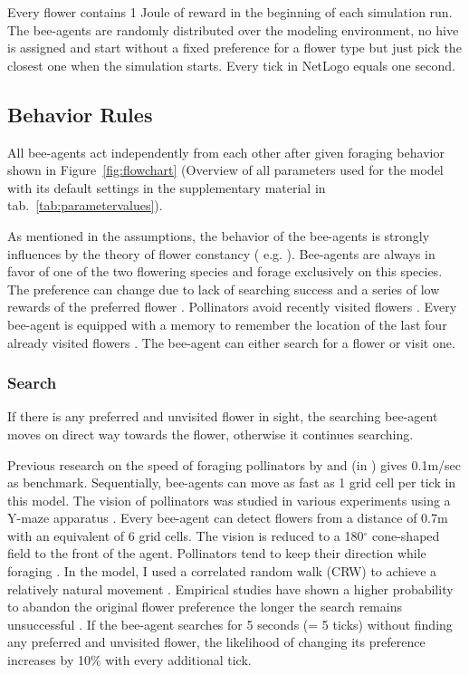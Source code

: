 Every flower contains 1 Joule of reward in the beginning of each simulation run. The bee-agents are randomly distributed over the modeling environment, no hive is assigned and start without a fixed preference for a flower type but just pick the closest one when the simulation starts. Every tick in NetLogo equals one second. 

\subsection*{Behavior Rules}

All bee-agents act independently from each other after given foraging behavior shown in Figure~\ref{fig:flowchart} (Overview of all parameters used for the model with its default settings in the supplementary material in tab.~\ref{tab:parametervalues}).  

As mentioned in the assumptions, the behavior of the bee-agents is strongly influences by the theory of flower constancy ( e.g. \citealp{bobisud1975pollinator, chittka1997foraging, thomson1981field, chittka1999flower,  goulson1994model,  goulson1999foraging}). Bee-agents are always in favor of one of the two flowering species and forage exclusively on this species. The preference can change due to lack of searching success and a series of low rewards of the preferred flower \citep{chittka1997foraging}. Pollinators avoid recently visited flowers \citep{goulson1999foraging}. Every bee-agent is equipped with a memory to remember the location of the last four already visited flowers \citep{goulson2000pollinators}. The bee-agent can either search for a flower or visit one. 

\subsubsection*{Search}
If there is any preferred and unvisited flower in sight, the searching bee-agent moves on direct way towards the flower, otherwise it continues searching. 

Previous research on the speed of foraging pollinators by \cite{essenberg2012explaining} and \cite{kunin1991few} (in  \citealt{kunin1996pollinator}) gives 0.1m/sec as benchmark. Sequentially, bee-agents can move as fast as 1 grid cell per tick in this model. The vision of pollinators was studied in various experiments using a Y-maze apparatus \citep{dyer2008comparative, wertlen2008detection, ne2001effect}. Every bee-agent can detect flowers from a distance of 0.7m with an equivalent of 6 grid cells. The vision is reduced to a 180$^{\circ}$ cone-shaped field to the front of the agent. Pollinators tend to keep their direction while foraging \citep{waddington1980flight}. In the model, I used a correlated random walk (CRW) to achieve a relatively natural movement \citep{bartumeus2005animal, codling2008random,  pyke1992flight, viswanathan2008levy}. Empirical studies have shown a higher probability to abandon the original flower preference the longer the search remains unsuccessful \citep{chittka1997foraging}. If the bee-agent searches for 5 seconds (= 5 ticks) without finding any preferred and unvisited flower, the likelihood of changing its preference increases by 10\% with every additional tick. \\

